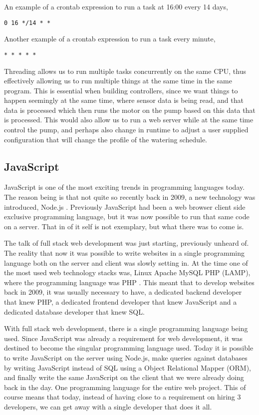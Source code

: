 \documentclass[a4paper,12pt,twoside,openright,titlepage]{book}
\begin{document}
An example of a crontab expression to run a task at 16:00 every 14 days,
\begin{verbatim}
0 16 */14 * *
\end{verbatim}

Another example of a crontab expression to run a task every minute,
\begin{verbatim}
* * * * *
\end{verbatim}

\bigskip

Threading allows us to run multiple tasks concurrently on the same CPU, thus effectively allowing us to run multiple things at the same time in the same program.
This is essential when building controllers, since we want things to happen seemingly at the same time, where sensor data is being read, and that data is processed which then runs the motor on the pump based on this data that is processed.
This would also allow us to run a web server while at the same time control the pump, and perhaps also change in runtime to adjust a user supplied configuration that will change the profile of the watering schedule.

\bigskip

\subsection{JavaScript}
JavaScript is one of the most exciting trends in programming languages today.
The reason being is that not quite so recently back in 2009, a new technology was introduced, Node.js \cite{nodejs_release}.
Previously JavaScript had been a web browser client side exclusive programming language, but it was now possible to run that same code on a server. That in of it self is not exemplary, but what there was to come is.

The talk of full stack web development was just starting, previously unheard of. The reality that now it was possible to write websites in a single programming language both on the server and client was slowly setting in. At the time one of the most used web technology stacks was, Linux Apache MySQL PHP (LAMP), where the programming language was PHP \cite{2009_programming}. This meant that to develop websites back in 2009, it was usually necessary to have, a dedicated backend developer that knew PHP, a dedicated frontend developer that knew JavaScript and a dedicated database developer that knew SQL.

With full stack web development, there is a single programming language being used. Since JavaScript was already a requirement for web development, it was destined to become the singular programming language used. Today it is possible to write JavaScript on the server using Node.js, make queries against databases by writing JavaScript instead of SQL using a Object Relational Mapper (ORM), and finally write the same JavaScript on the client that we were already doing back in the day. One programming language for the entire web project. This of course means that today, instead of having close to a requirement on hiring 3 developers, we can get away with a single developer that does it all.
\end{document}
